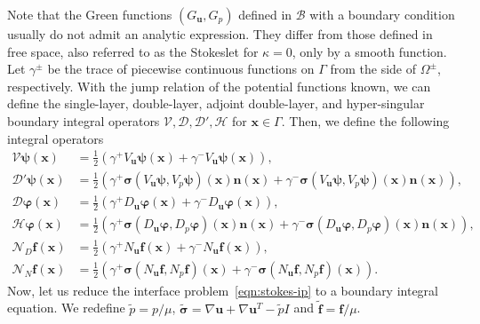 \documentclass[preprint,11pt]{elsarticle}
\theoremstyle{remark}
\newcommand{\paren}[1]{\left(#1\right)}
\newcommand{\grad}[1]{\nabla #1}
\newcommand{\mc}[1]{\mathcal{#1}}
\newcommand{\wt}[1]{\widetilde{#1}}
\newcommand{\bm}[1]{\boldsymbol{#1}}
\newcommand{\vph}{\varphi}
\begin{document}
Note that the Green functions $(G_{\bm u}, G_p)$ defined in $\mathcal{B}$ with a boundary condition usually do not admit an analytic expression. They differ from those defined in free space, also referred to as the Stokeslet for $\kappa=0$, only by a smooth function. 
Let $\gamma^\pm$ be the trace of piecewise continuous functions on $\Gamma$ from the side of $\Omega^\pm$, respectively.
With the jump relation of the potential functions known, we can define the single-layer, double-layer, adjoint double-layer, and hyper-singular boundary integral operators $\mc V, \mc D, \mc D', \mc H$ for $\bm x \in\Gamma$. Then, we define the following integral operators
\begin{align}
      \mc V \bm \psi (\bm x) &= \frac{1}{2}\paren{\gamma^+  V_{\bm u }\bm \psi (\bm x ) + \gamma^-  V_{\bm u }\bm \psi (\bm x )},  \label{eqn:sl-bi} \\
      \mc D'\bm \psi (\bm x) &= \frac{1}{2}\paren{\gamma^+  \bm{\sigma}(  V_{\bm u }\bm \psi ,  V_{p}\bm \psi )(\bm x ) \bm{n}(\bm x) + \gamma^-  \bm{\sigma}(  V_{\bm u }\bm \psi ,  V_{p}\bm \psi )(\bm x ) \bm{n}(\bm x)}, \label{eqn:adl-bi}  \\
     \mc D  \bm \vph (\bm x) &= \frac{1}{2}\paren{ \gamma^+  D_{\bm u }\bm \vph (\bm x ) + \gamma^-  D_{\bm u }\bm \vph (\bm x ) }, \label{eqn:dl-bi} \\
     \mc H  \bm \vph (\bm x) &= \frac{1}{2}\paren{ \gamma^+ \bm{\sigma} ( D_{\bm u }\bm \vph ,  D_{p}\bm \vph )(\bm x )\bm{n}(\bm x) + \gamma^- \bm{\sigma} ( D_{\bm u }\bm \vph ,  D_{p}\bm \vph )(\bm x )\bm{n}(\bm x)}, \label{eqn:hs-bi}  \\
     \mc N_D \bm f(\bm x) & = \frac{1}{2}\paren{\gamma^+ N_{\bm u}\bm f(\bm x) + \gamma^- N_{\bm u}\bm f(\bm x) }, \label{eqn:vp-D}\\
     \mc N_N \bm f(\bm x) & = \frac{1}{2}\paren{\gamma^+ \bm \sigma(N_{\bm u}\bm f, N_p \bm f)(\bm x) + \gamma^- \bm \sigma(N_{\bm u}\bm f, N_p \bm f)(\bm x)} .\label{eqn:vp-N}
\end{align}
Now, let us reduce the interface problem~\eqref{eqn:stokes-ip} to a boundary integral equation.
We redefine $\wt p = p/\mu$,  $\wt{\bm \sigma} = \grad \bm u + \grad \bm u^T - \wt p I$ and $\wt {\bm f} = \bm f/\mu$. 
\end{document}
